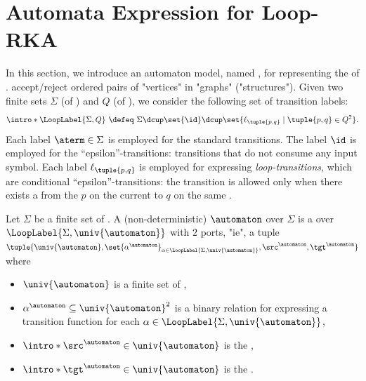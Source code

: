 \section{Automata Expression for Loop-RKA}\label{section: loop-automata}
\AP
In this section,
we introduce an automaton model, named \emph{},
for representing the  of .
 accept/reject ordered pairs of "vertices" in "graphs" ("structures").
Given two finite sets $\Sigma$ (of ) and $Q$ (of \intro*{}),
we consider the following set of transition labels:
\AP
\[\intro*\LoopLabel{\Sigma, Q} ~\defeq~ \Sigma \dcup \set{\id} \dcup \set{\ell_{\tuple{p, q}} \mid \tuple{p, q} \in Q^2}.\]
Each label $\aterm \in \Sigma$
is employed for the standard transitions.
The label $\id$ is employed for the ``epsilon''-transitions:
transitions that do not consume any input symbol.
Each label $\ell_{\tuple{p, q}}$ is employed for expressing \emph{loop-transitions}, which are conditional ``epsilon''-transitions: the transition is allowed only when there exists a  from the  $p$ on the current  to $q$ on the same .

\begin{definition}\label{definition: loop-automata}
Let $\Sigma$ be a finite set of .
A (non-deterministic) \intro*{} $\automaton$ over $\Sigma$ is a  over $\LoopLabel{\Sigma, \univ{\automaton}}$ with $2$ ports, "ie",
a tuple $\tuple{\univ{\automaton}, \set{\alpha^{\automaton}}_{\alpha \in \LoopLabel{\Sigma, \univ{\automaton}}}, \src^{\automaton}, \tgt^{\automaton}}$ where
\begin{itemize}
    \item $\univ{\automaton}$ is a finite set of ,
    \item $\alpha^{\automaton} \subseteq \univ{\automaton}^2$ is a binary relation for expressing a transition function for each $\alpha \in \LoopLabel{\Sigma, \univ{\automaton}}$,
    \item $\intro*\src^{\automaton} \in \univ{\automaton}$ is the  ,
    \item $\intro*\tgt^{\automaton} \in \univ{\automaton}$ is the  .
\end{itemize}
\end{definition}

